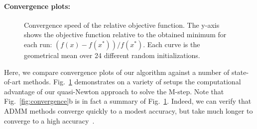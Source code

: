 \paragraph{Convergence plots:}

\begin{figure}[htb]
    \centering
    \caption[Convergence speed of the relative objective function.]{Convergence speed of the relative objective function. The y-axis shows the objective function relative to the obtained minimum for each run: $(f(x) - f(x^*))/f(x^*)$. Each curve is the geometrical mean over 24 different random initializations.}
    \label{fig:convergence_setups}
\end{figure}

Here, we compare convergence plots of our algorithm against a number of state-of-art methods. Fig.~\ref{fig:convergence_setups} demonstrates on a variety of setups the computational
advantage of our quasi-Newton approach to solve the M-step.
Note that Fig.~\ref{fig:convergence}b is in fact a summary of Fig.~\ref{fig:convergence_setups}. 
Indeed, we can verify that ADMM methods converge quickly to a modest accuracy, but take much longer to converge to a high accuracy~\citep{boyd2011distributed}.

